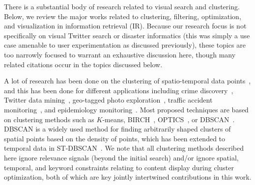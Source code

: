 


There is a substantial body of research related to visual search and clustering. 
Below, we review the major works related to clustering, filtering, optimization, and visualization in information retrieval (IR).  Because our research focus is not specifically on visual Twitter search or disaster informatics (this was simply a use case amenable to user experimentation as discussed previously), these topics are too narrowly focused to warrant an exhaustive discussion here, though many related citations occur in the topics discussed below.


 A lot of research has been done on the clustering of spatio-temporal data points~\cite{Kisilevich2010,Atluri2018}, and this has been done 
for different applications including crime discovery~\cite{Eftelioglu2014}, Twitter data mining~\cite{Abdelhaq2013,Chierichetti2014,Walther2013,Chae2012}, geo-tagged photo exploration~\cite{Zheng2012,Xie2013}, traffic accident monitoring~\cite{Zheng2012}, and epidemiology monitoring~\cite{Glatman-Freedman2016}.
Most proposed techniques are based on clustering methods such as $K$-means,  BIRCH~\cite{Zhang1996},  OPTICS~\cite{Ankerst1999}, or DBSCAN~\cite{Ester1996}. DBSCAN is a widely used method for finding arbitrarily shaped clusters of spatial points based on the density of points, which has been extended to temporal data in ST-DBSCAN~\cite{Birant2007}.  %
We note that all clustering methods described here ignore relevance signals (beyond the initial search) and/or ignore spatial, temporal, and keyword constraints
relating to content display during cluster optimization, both of which are key jointly intertwined contributions in this work.  


